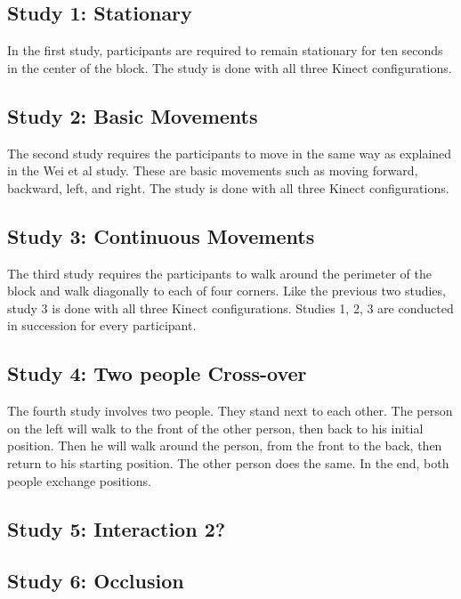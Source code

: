 \documentclass{sigchi}
\begin{document}
\subsection{Study 1: Stationary}

In the first study, participants are required to remain stationary for ten seconds in the center of the block. The study is done with all three Kinect configurations.

\subsection{Study 2: Basic Movements}

The second study requires the participants to move in the same way as explained in the Wei et al study. These are basic movements such as moving forward, backward, left, and right. The study is done with all three Kinect configurations.

\subsection{Study 3: Continuous Movements}

The third study requires the participants to walk around the perimeter of the block and walk diagonally to each of four corners. Like the previous two studies, study 3 is done with all three Kinect configurations. Studies 1, 2, 3 are conducted in succession for every participant.

\subsection{Study 4: Two people Cross-over}

The fourth study involves two people. They stand next to each other. The person on the left will walk to the front of the other person, then back to his initial position. Then he will walk around the person, from the front to the back, then return to his starting position. The other person does the same. In the end, both people exchange positions.

\subsection{Study 5: Interaction 2?}

\subsection{Study 6: Occlusion}
\end{document}
